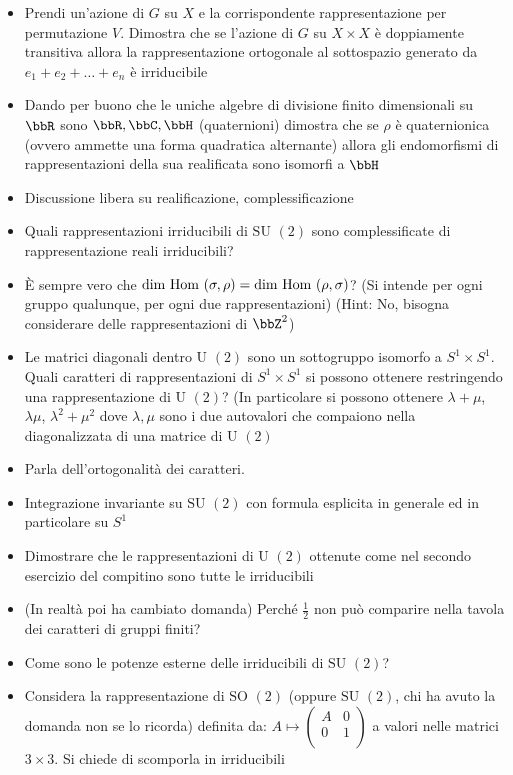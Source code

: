 \documentclass[a4paper,NoNotes,GeneralMath]{stdmdoc}
\newcommand{\SU}{\text{SU }}
\newcommand{\SO}{\text{SO }}
\newcommand{\U}{\text{U }}
\newcommand{\Hom}{\text{Hom }}
\begin{document}
\begin{itemize}
		\item Prendi un'azione di $G$ su $X$ e la corrispondente rappresentazione per permutazione $V$. Dimostra che se l'azione di $G$ su $X\times X$ è doppiamente transitiva allora la rappresentazione ortogonale al sottospazio generato da ${e_1 + e_2 + \ldots + e_n}$ è irriducibile
		\item Dando per buono che le uniche algebre di divisione finito dimensionali su $\bbR$ sono $\bbR, \bbC, \bbH$ (quaternioni) dimostra che se $\rho$ è quaternionica (ovvero ammette una forma quadratica alternante) allora gli endomorfismi di rappresentazioni della sua realificata sono isomorfi a $\bbH$
		\item Discussione libera su realificazione, complessificazione
		\item Quali rappresentazioni irriducibili di $\SU(2)$ sono complessificate di rappresentazione reali irriducibili?
		\item È sempre vero che $\Dim \Hom(\sigma, \rho) = \Dim \Hom(\rho, \sigma)$? (Si intende per ogni gruppo qualunque, per ogni due rappresentazioni) (Hint: No, bisogna considerare delle rappresentazioni di $\bbZ^2$)
		\item Le matrici diagonali dentro $\U(2)$ sono un sottogruppo isomorfo a $S^1 \times S^1$. Quali caratteri di rappresentazioni di $S^1 \times S^1$ si possono ottenere restringendo una rappresentazione di $\U(2)$? (In particolare si possono ottenere $\lambda + \mu$, $\lambda\mu$, $\lambda^2 + \mu^2$ dove $\lambda, \mu$ sono i due autovalori che compaiono nella diagonalizzata di una matrice di $\U(2)$
		\item Parla dell'ortogonalità dei caratteri.
		\item Integrazione invariante su $\SU(2)$ con formula esplicita in generale ed in particolare su $S^1$
		\item Dimostrare che le rappresentazioni di $\U(2)$ ottenute come nel secondo esercizio del compitino sono tutte le irriducibili
		\item (In realtà poi ha cambiato domanda) Perché $\frac{1}{2}$ non può comparire nella tavola dei caratteri di gruppi finiti?
		\item Come sono le potenze esterne delle irriducibili di $\SU(2)$?
		\item Considera la rappresentazione di $\SO(2)$ (oppure $\SU(2)$, chi ha avuto la domanda non se lo ricorda) definita da: $A \mapsto \left( \begin{array}{cc} A & 0 \\ 0 & 1 \\ \end{array} \right)$ a valori nelle matrici $3\times 3$. Si chiede di scomporla in irriducibili

\end{itemize}
\end{document}
